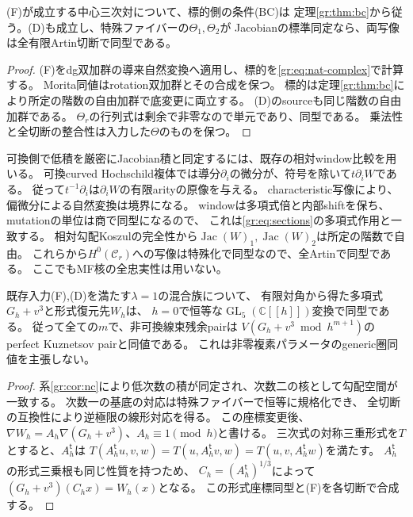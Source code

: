\begin{corollary}\label{gr:cor:nc}
(F)が成立する中心三次対について、標的側の条件(BC)は
定理\ref{gr:thm:bc}から従う。(D)も成立し、特殊ファイバーの$\Theta_1,\Theta_2$が
Jacobianの標準同定なら、両写像は全有限Artin切断で同型である。
\end{corollary}
\begin{proof}
(F)をdg双加群の導来自然変換へ適用し、標的を\eqref{gr:eq:nat-complex}で計算する。
Morita同値はrotation双加群とその合成を保つ。
標的は定理\ref{gr:thm:bc}により所定の階数の自由加群で底変更に両立する。
(D)のsourceも同じ階数の自由加群である。
$\Theta_r$の行列式は剰余で非零なので単元であり、同型である。
乗法性と全切断の整合性は入力した$\Theta$のものを保つ。
\end{proof}

可換側で低積を厳密にJacobian積と同定するには、既存の相対window比較を用いる。
可換curved Hochschild複体では導分$\partial_i$の微分が、符号を除いて$t\partial_iW$である。
従って$t^{-1}\partial_i$は$\partial_iW$の有限arityの原像を与える。
characteristic写像により、偏微分による自然変換は境界になる。
windowは多項式倍と内部shiftを保ち、mutationの単位は商で同型になるので、
これは\eqref{gr:eq:sections}の多項式作用と一致する。
相対勾配Koszulの完全性から$\operatorname{Jac}(W)_1,\operatorname{Jac}(W)_2$は所定の階数で自由。
これらから$H^0(\mathcal C_r)$への写像は特殊化で同型なので、全Artinで同型である。
ここでもMF核の全忠実性は用いない。

\begin{corollary}[計算済み三次式の形式的同定]\label{gr:cor:formal-polynomial}
既存入力(F),(D)を満たす$\lambda=1$の混合族について、
有限対角から得た多項式$G_h+v^3$と形式復元先$W_h$は、
$h=0$で恒等な$\operatorname{GL}_5(\mathbb C[[h]])$変換で同型である。
従って全ての$m$で、非可換線束残余pairは
$V(G_h+v^3\bmod h^{m+1})$のperfect Kuznetsov pairと同値である。
これは非零複素パラメータのgeneric圏同値を主張しない。
\end{corollary}
\begin{proof}
系\ref{gr:cor:nc}により低次数の積が同定され、次数二の核として勾配空間が一致する。
次数一の基底の対応は特殊ファイバーで恒等に規格化でき、
全切断の互換性により逆極限の線形対応を得る。
この座標変更後、$\nabla W_h=A_h\nabla(G_h+v^3)$、$A_h\equiv1\pmod h$と書ける。
三次式の対称三重形式を$T$とすると、$A_h^{\mathsf t}$は
$T(A_h^{\mathsf t}u,v,w)=T(u,A_h^{\mathsf t}v,w)=T(u,v,A_h^{\mathsf t}w)$を満たす。
$A_h^{\mathsf t}$の形式三乗根も同じ性質を持つため、
$C_h=(A_h^{\mathsf t})^{1/3}$によって
$(G_h+v^3)(C_hx)=W_h(x)$となる。
この形式座標同型と(F)を各切断で合成する。
\end{proof}

